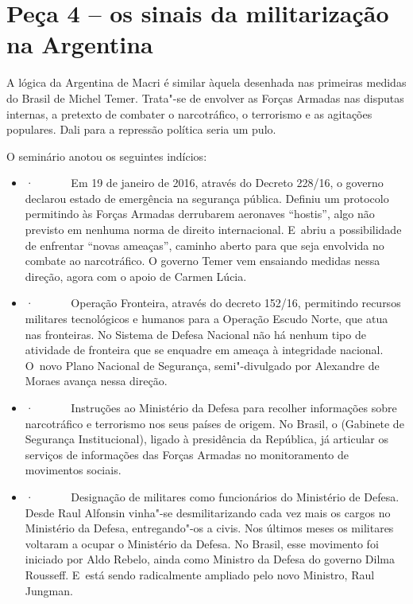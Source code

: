 \section{Peça 4 -- os sinais da militarização na Argentina}

A lógica da Argentina de Macri é similar àquela desenhada nas primeiras
medidas do Brasil de Michel Temer. Trata"-se de envolver as Forças
Armadas nas disputas internas, a pretexto de combater o narcotráfico, o
terrorismo e as agitações populares. Dali para a repressão política
seria um pulo.

O seminário anotou os seguintes indícios:

\begin{itemize}
\itemsep1pt\parskip0pt
\item
  ·~~~~~~ Em 19 de janeiro de 2016, através do Decreto 228/\allowbreak{}16, o governo
  declarou estado de emergência na segurança pública. Definiu um
  protocolo permitindo às Forças Armadas derrubarem aeronaves
  ``hostis'', algo não previsto em nenhuma norma de direito
  internacional. E~abriu a possibilidade de enfrentar ``novas ameaças'',
  caminho aberto para que seja envolvida no combate ao narcotráfico. O
  governo Temer vem ensaiando medidas nessa direção, agora com o apoio
  de Carmen Lúcia.
\item
  ·~~~~~~ Operação Fronteira, através do decreto 152/\allowbreak{}16, permitindo
  recursos militares tecnológicos e humanos para a Operação Escudo
  Norte, que atua nas fronteiras. No Sistema de Defesa Nacional não há
  nenhum tipo de atividade de fronteira que se enquadre em ameaça à
  integridade nacional. O~novo Plano Nacional de Segurança,
  semi"-divulgado por Alexandre de Moraes avança nessa direção.
\item
  ·~~~~~~ Instruções ao Ministério da Defesa para recolher informações
  sobre narcotráfico e terrorismo nos seus países de origem. No Brasil,
  o  (Gabinete de Segurança Institucional), ligado à presidência da
  República, já articular os serviços de informações das Forças Armadas
  no monitoramento de movimentos sociais.
\item
  ·~~~~~~ Designação de militares como funcionários do Ministério de
  Defesa. Desde Raul Alfonsin vinha"-se desmilitarizando cada vez mais os
  cargos no Ministério da Defesa, entregando"-os a civis. Nos últimos
  meses os militares voltaram a ocupar o Ministério da Defesa. No
  Brasil, esse movimento foi iniciado por Aldo Rebelo, ainda como
  Ministro da Defesa do governo Dilma Rousseff. E~está sendo
  radicalmente ampliado pelo novo Ministro, Raul Jungman.
\end{itemize}

